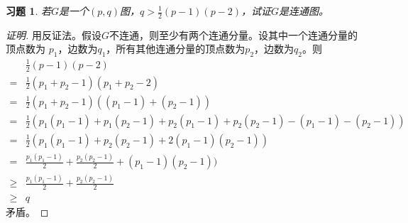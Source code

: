 \documentclass{article}
\begin{document}
\begin{CJK}{UTF8}{gbsn}
\newtheorem*{Ex}{习题}
  \begin{Ex}
  若$G$是一个$(p,q)$图，$q > \frac{1}{2}(p-1)(p-2)$，试证$G$是连通图。  
  \end{Ex}
  \begin{proof}[证明]
    用反证法。假设$G$不连通，则至少有两个连通分量。设其中一个连通分量的顶点数为
    $p_1$，边数为$q_1$，所有其他连通分量的顶点数为$p_2$，边数为$q_2$。则
    \begin{equation*}
      \begin{split}
        &\frac{1}{2}(p-1)(p-2)\\
        =&\frac{1}{2}(p_1 + p_2 -1)(p_1 + p_2 -2)\\
        =&\frac{1}{2}(p_1 + p_2 -1)((p_1 - 1) + (p_2 - 1))\\
        =&\frac{1}{2}(p_1(p_1 -1) +  p_1(p_2 - 1) + p_2(p_1 - 1) + p_2(p_2-1) - (p_1 - 1) - (p_2-1))\\
        =&\frac{1}{2}(p_1(p_1 -1) +   p_2(p_2-1) + 2(p_1 - 1)(p_2-1))\\
        =&\frac{p_1(p_1 -1)}{2} +   \frac{p_2(p_2-1)}{2} + (p_1 - 1)(p_2-1))\\
        \geq&\frac{p_1(p_1 -1)}{2} +   \frac{p_2(p_2-1)}{2}\\
        \geq & q
      \end{split}
    \end{equation*}
    矛盾。
  \end{proof}
\end{CJK}
\end{document}
